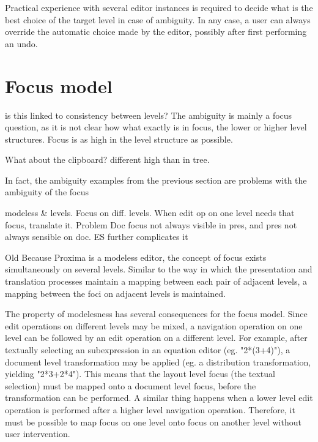 Practical experience with several editor instances is required to decide what is the best choice of the target level in case of ambiguity. In any case, a user can always override the automatic choice made by the editor, possibly after first performing an undo.



%																
%																
%																
\section{Focus model} \label{sect:focus}

\bc
is this linked to consistency between levels?
The ambiguity is mainly a focus question, as it is not clear how what exactly is in focus, the lower or higher level structures. Focus is as high in the level structure as possible.

What about the clipboard?
different high than in tree.

In fact, the ambiguity examples from the previous section are problems with the ambiguity of the focus
\ec

\bc modeless & levels. Focus on diff. levels. When edit op on one level needs that focus, translate it. Problem Doc focus not always visible in pres, and pres not always sensible on doc. ES further complicates it
\ec


\bc Old
Because Proxima is a modeless editor, the concept of focus exists simultaneously on several levels.  Similar to the way in which the presentation and translation processes maintain a mapping between each pair of adjacent levels, a mapping between the foci on adjacent levels is maintained. 
\ec

The property of modelesness has several consequences for the focus model. Since edit operations on different levels may be mixed, a navigation operation on one level can be followed by an edit operation on a different level. For example, after textually selecting an subexpression in an equation editor (eg. "2*(3+4)"), a document level transformation may be applied (eg. a distribution transformation, yielding "2*3+2*4"). This means that the layout level focus (the textual selection) must be mapped onto a document level focus, before the transformation can be performed. A similar thing happens when a lower level edit operation is performed after a higher level navigation operation. Therefore, it must be possible to map focus on one level onto focus on another level without user intervention.

